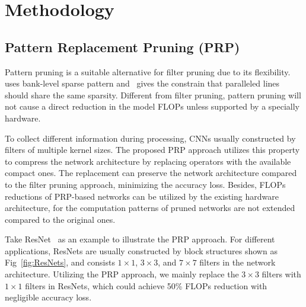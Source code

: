 \documentclass[journal,article,submit,pdftex,moreauthors]{Definitions/mdpi}
\begin{document}



\section{Methodology}\label{sec: method}

\subsection{Pattern Replacement Pruning (PRP)}
Pattern pruning is a suitable alternative for filter pruning due to its flexibility. \cite{banksparse} uses bank-level sparse pattern and~\cite{ese} gives the constrain that paralleled lines should share the same sparsity. Different from filter pruning, pattern pruning will not cause a direct reduction in the model FLOPs unless supported by a specially hardware. 

To collect different information during processing, CNNs usually constructed by filters of multiple kernel sizes. The proposed PRP approach utilizes this property to compress the network architecture by replacing operators with the available compact ones. The replacement can preserve the network architecture compared to the filter pruning approach, minimizing the accuracy loss. Besides, FLOPs reductions of PRP-based networks can be utilized by the existing hardware architecture, for the computation patterns of pruned networks are not extended compared to the original ones.

Take ResNet~\cite{M19} as an example to illustrate the PRP approach. For different applications, ResNets are usually constructed by block structures shown as Fig~\ref{fig:ResNets}, and consists $1\times 1$, $3\times 3$, and $7\times 7$ filters in the network architecture. Utilizing the PRP approach, we mainly replace the $3\times 3$ filters with $1\times 1$ filters in ResNets, which could achieve 50\% FLOPs reduction with negligible accuracy loss. 
\end{document}

